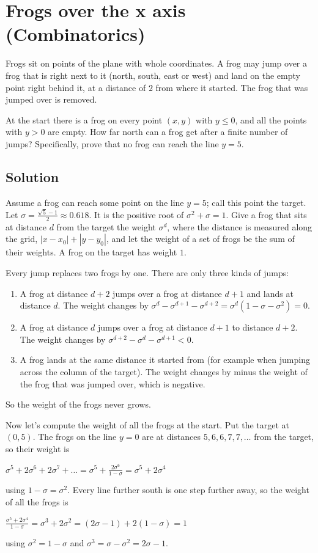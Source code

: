\section {Frogs over the x axis (Combinatorics)}

Frogs sit on points of the plane with whole coordinates. A frog may jump over a frog that is right next to it
(north, south, east or west) and land on the empty point right behind it, at a distance of $2$ from where it started.
The frog that was jumped over is removed.

At the start there is a frog on every point $(x,y)$ with $y \le 0$, and all the points with $y > 0$ are empty.
How far north can a frog get after a finite number of jumps? Specifically, prove that no frog can reach the line $y=5$.

\subsection{Solution}

Assume a frog can reach some point on the line $y=5$; call this point the target.
Let $\sigma = \frac{\sqrt{5}-1}{2} \approx 0.618$. It is the positive root of $\sigma^2 + \sigma = 1$.
Give a frog that sits at distance $d$ from the target the weight $\sigma^d$, where the distance is measured along the grid,
$|x-x_0|+|y-y_0|$, and let the weight of a set of frogs be the sum of their weights.
A frog on the target has weight $1$.

Every jump replaces two frogs by one. There are only three kinds of jumps:
\begin{enumerate}
\item A frog at distance $d+2$ jumps over a frog at distance $d+1$ and lands at distance $d$.
The weight changes by $\sigma^d - \sigma^{d+1} - \sigma^{d+2} = \sigma^d(1-\sigma-\sigma^2) = 0$.
\item A frog at distance $d$ jumps over a frog at distance $d+1$ to distance $d+2$.
The weight changes by $\sigma^{d+2} - \sigma^d - \sigma^{d+1} < 0$.
\item A frog lands at the same distance it started from (for example when jumping across the column of the target).
The weight changes by minus the weight of the frog that was jumped over, which is negative.
\end{enumerate}
So the weight of the frogs never grows.

Now let's compute the weight of all the frogs at the start. Put the target at $(0,5)$.
The frogs on the line $y=0$ are at distances $5, 6, 6, 7, 7, \ldots$ from the target, so their weight is
\begin{center}
$\sigma^5 + 2\sigma^6 + 2\sigma^7 + \ldots = \sigma^5 + \frac{2\sigma^6}{1-\sigma} = \sigma^5 + 2\sigma^4$
\end{center}
using $1-\sigma = \sigma^2$. Every line further south is one step further away, so the weight of all the frogs is
\begin{center}
$\frac{\sigma^5 + 2\sigma^4}{1-\sigma} = \sigma^3 + 2\sigma^2 = (2\sigma - 1) + 2(1-\sigma) = 1$
\end{center}
using $\sigma^2 = 1-\sigma$ and $\sigma^3 = \sigma - \sigma^2 = 2\sigma - 1$.

